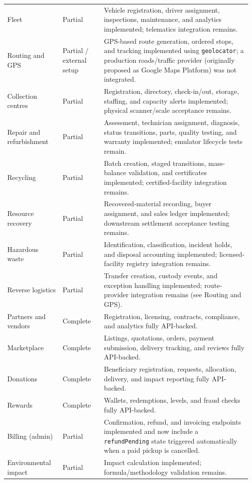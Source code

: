 \begin{longtable}{@{}p{3.6cm}p{2.4cm}p{7.2cm}@{}}
Fleet & Partial & Vehicle registration, driver assignment, inspections, maintenance, and analytics implemented; telematics integration remains. \\
Routing and GPS & Partial / external setup & GPS-based route generation, ordered stops, and tracking implemented using \texttt{geolocator}; a production roads/traffic provider (originally proposed as Google Maps Platform) was not integrated. \\
Collection centres & Partial & Registration, directory, check-in/out, storage, staffing, and capacity alerts implemented; physical scanner/scale acceptance remains. \\
Repair and refurbishment & Partial & Assessment, technician assignment, diagnosis, status transitions, parts, quality testing, and warranty implemented; emulator lifecycle tests remain. \\
Recycling & Partial & Batch creation, staged transitions, mass-balance validation, and certificates implemented; certified-facility integration remains. \\
Resource recovery & Partial & Recovered-material recording, buyer assignment, and sales ledger implemented; downstream settlement acceptance testing remains. \\
Hazardous waste & Partial & Identification, classification, incident holds, and disposal accounting implemented; licensed-facility registry integration remains. \\
Reverse logistics & Partial & Transfer creation, custody events, and exception handling implemented; route-provider integration remains (see Routing and GPS). \\
Partners and vendors & Complete & Registration, licensing, contracts, compliance, and analytics fully API-backed. \\
Marketplace & Complete & Listings, quotations, orders, payment submission, delivery tracking, and reviews fully API-backed. \\
Donations & Complete & Beneficiary registration, requests, allocation, delivery, and impact reporting fully API-backed. \\
Rewards & Complete & Wallets, redemptions, levels, and fraud checks fully API-backed. \\
Billing (admin) & Partial & Confirmation, refund, and invoicing endpoints implemented and now include a \texttt{refundPending} state triggered automatically when a paid pickup is cancelled. \\
Environmental impact & Partial & Impact calculation implemented; formula/methodology validation remains. \\

\end{longtable}
